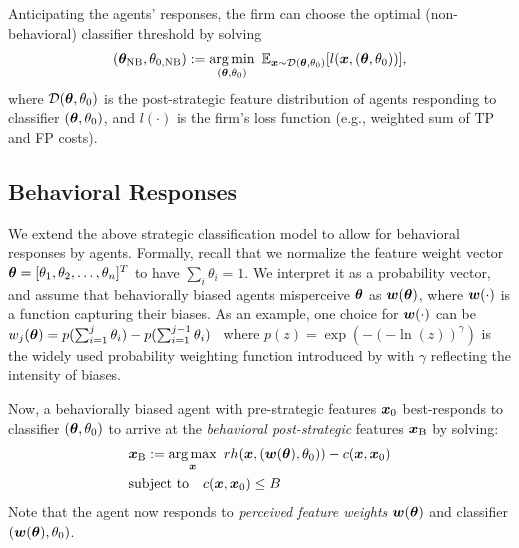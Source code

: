 Anticipating the agents' responses, the firm can choose the optimal (non-behavioral) classifier threshold by solving 
\begin{align}
({\bm{\theta}}_\text{NB}, \theta_{0, \text{NB}}) := \operatorname*{arg\,min}_{({\bm{\theta}}, \theta_0)} ~ \mathbb{E}_{{\bm{x}}\sim\mathcal{D}({\bm{\theta}}, \theta_0)}[l({\bm{x}}, ({\bm{\theta}}, \theta_0))],
\label{eq:NB-firm-U}
\end{align}
where $\mathcal{D}({\bm{\theta}}, \theta_0)$ is the post-strategic feature distribution of agents responding to classifier $({\bm{\theta}}, \theta_0)$, and $l(\cdot)$ is the firm's loss function (e.g., weighted sum of TP and FP costs).  

\subsection{Behavioral Responses}
We extend the above strategic classification model to allow for behavioral responses by agents. Formally, recall that we normalize the feature weight vector ${\bm{\theta}}=[\theta_1, \theta_2, \ldots, \theta_n]^T$ to have $\sum_i \theta_i=1$. We interpret it as a probability vector, and assume that behaviorally biased agents misperceive ${\bm{\theta}}$ as ${\bm{w}}({\bm{\theta}})$, where ${\bm{w}}(\cdot)$ is a function capturing their biases. As an example, one choice for ${\bm{w}}(\cdot)$ can be ${w}_j({\bm{\theta}}) = p(\sum_{i=1}^j \theta_i)-p(\sum_{i=1}^{j-1} \theta_i)$~\cite{gonzalez1999shape} where $p(z)=\exp(-(-\ln(z))^\gamma)$ is the widely used probability weighting function introduced by \cite{Prelec1998} with $\gamma$ reflecting the intensity of biases. 

Now, a behaviorally biased agent with {pre-strategic} features ${\bm{x}}_0$ best-responds to classifier $({\bm{\theta}}, \theta_0)$ to arrive at the \emph{behavioral post-strategic} features ${\bm{x}}_{\text{B}}$ by solving:
\begin{align}\label{eq:agent-optimization-behavioral}
    &{\bm{x}}_\text{B} := \operatorname*{arg\,max}_{\bm{x}} ~ rh({\bm{x}}, ({\bm{w}}({\bm{\theta}}), \theta_0))-c({\bm{x}}, {\bm{x}}_0)\notag\\
    &\text{subject to} \quad c({\bm{x}}, {\bm{x}}_0)\le B
\end{align}
Note that the agent now responds to \emph{perceived feature weights} ${\bm{w}}({\bm{\theta}})$ and classifier $({\bm{w}}({\bm{\theta}}), \theta_0)$. 

